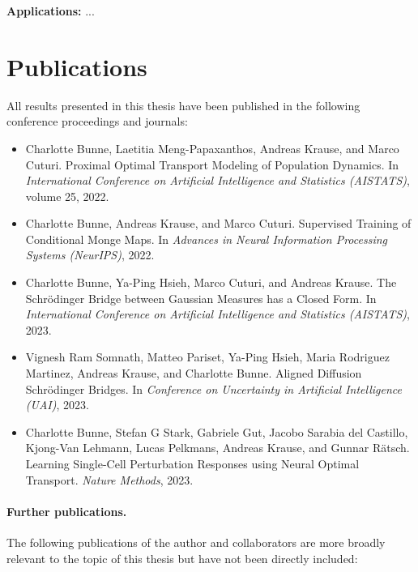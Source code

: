 \textbf{Applications:} ...


\section{Publications}
All results presented in this thesis have been published in the following conference proceedings and journals:

\begin{itemize}
	\item[] Charlotte Bunne, Laetitia Meng-Papaxanthos, Andreas Krause, and Marco Cuturi. Proximal Optimal Transport Modeling of Population Dynamics. In \textit{International Conference on Artificial Intelligence and Statistics (AISTATS)}, volume 25, 2022.
	\item[] Charlotte Bunne, Andreas Krause, and Marco Cuturi. Supervised Training of Conditional Monge Maps. In \textit{Advances in Neural Information Processing Systems (NeurIPS)}, 2022.
	\item[] Charlotte Bunne, Ya-Ping Hsieh, Marco Cuturi, and Andreas Krause. The Schr{\"o}dinger Bridge between Gaussian Measures has a Closed Form. In \textit{International Conference on Artificial Intelligence and Statistics (AISTATS)}, 2023.
	\item[] Vignesh Ram Somnath, Matteo Pariset, Ya-Ping Hsieh, Maria Rodriguez Martinez, Andreas Krause, and Charlotte Bunne. Aligned Diffusion Schr{\"o}dinger Bridges. In \textit{Conference on Uncertainty in Artificial Intelligence (UAI)}, 2023.
	\item[] Charlotte Bunne, Stefan G Stark, Gabriele Gut, Jacobo Sarabia del Castillo, Kjong-Van Lehmann, Lucas Pelkmans, Andreas Krause, and Gunnar R{\"a}tsch. Learning Single-Cell Perturbation Responses using Neural Optimal Transport. \textit{Nature Methods}, 2023.
\end{itemize}

\paragraph{Further publications.}
The following publications of the author and collaborators are more broadly relevant to the topic of this thesis but have not been directly included:

